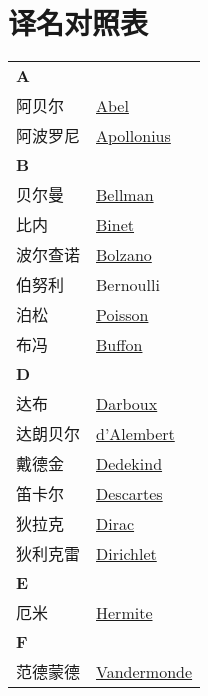\chapter{译名对照表}
\def\InsertTable#1{\begin{longtable}{ll} #1 \end{longtable}}%
\InsertTable{
    \textbf{A} \\
    阿贝尔 & \href{https://mathshistory.st-andrews.ac.uk/Biographies/Abel/}{Abel} \\
    阿波罗尼 & \href{https://mathshistory.st-andrews.ac.uk/Biographies/Apollonius/}{Apollonius} \\
    \textbf{B} \\
    贝尔曼 & \href{https://mathshistory.st-andrews.ac.uk/Biographies/Bellman/}{Bellman} \\
    比内 & \href{https://mathshistory.st-andrews.ac.uk/Biographies/Binet/}{Binet} \\
    波尔查诺 & \href{https://mathshistory.st-andrews.ac.uk/Biographies/Bolzano/}{Bolzano} \\
    伯努利 & Bernoulli \\
    泊松 & \href{https://mathshistory.st-andrews.ac.uk/Biographies/Poisson/}{Poisson} \\
    布冯 & \href{https://mathshistory.st-andrews.ac.uk/Biographies/Buffon/}{Buffon} \\
    \textbf{D} \\
    达布 & \href{https://mathshistory.st-andrews.ac.uk/Biographies/Darboux/}{Darboux} \\
    达朗贝尔 & \href{https://mathshistory.st-andrews.ac.uk/Biographies/DAlembert/}{d'Alembert} \\
    戴德金 & \href{https://mathshistory.st-andrews.ac.uk/Biographies/Dedekind/}{Dedekind} \\
    笛卡尔 & \href{https://mathshistory.st-andrews.ac.uk/Biographies/Descartes/}{Descartes} \\
    狄拉克 & \href{https://mathshistory.st-andrews.ac.uk/Biographies/Dirac/}{Dirac} \\
    狄利克雷 & \href{https://mathshistory.st-andrews.ac.uk/Biographies/Dirichlet/}{Dirichlet} \\
    \textbf{E} \\
    厄米 & \href{https://mathshistory.st-andrews.ac.uk/Biographies/Hermite/}{Hermite} \\
    \textbf{F} \\
    范德蒙德 & \href{https://mathshistory.st-andrews.ac.uk/Biographies/Vandermonde/}{Vandermonde} \\
}

